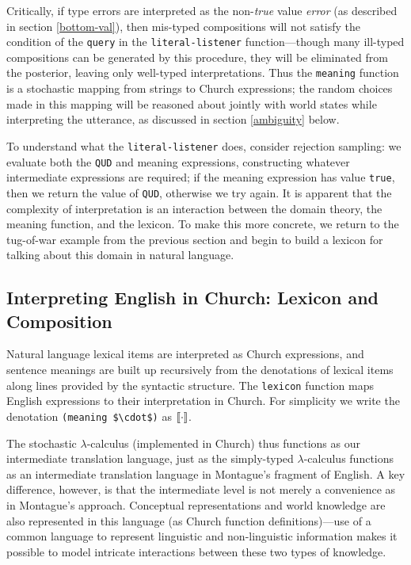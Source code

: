 \documentclass[12pt]{article}
\newcommand{\llbracket}{\ensuremath{\left [\!\left [}}%
\newcommand{\rrbracket}{\ensuremath{\right ]\!\right ]}}
\newcommand{\denot}[1]{\ensuremath{\llbracket \mathit{#1} \rrbracket}}
\begin{document}
Critically, if type errors are interpreted as the non-\emph{true} value \emph{error} (as described in section \ref{bottom-val}), then mis-typed compositions will not satisfy the condition of the \lstinline{query} in the \lstinline{literal-listener} function---though many ill-typed compositions can be generated by this procedure, they will be eliminated from the posterior, leaving only well-typed interpretations.
Thus the \lstinline{meaning} function is a stochastic mapping from strings to Church expressions; the random choices made in this mapping will be reasoned about jointly with world states while interpreting the utterance, as discussed in section \ref{ambiguity} below.

To understand what the \lstinline{literal-listener} does, consider rejection sampling: we evaluate both the \lstinline{QUD} and meaning expressions, constructing whatever intermediate expressions are required; if the meaning expression has value \lstinline{true}, then we return the value of \lstinline{QUD}, otherwise we try again. 
It is apparent that the complexity of interpretation is an interaction between the domain theory, the meaning function, and the lexicon. 
To make this more concrete, we return to the tug-of-war example from the previous section and begin to build a lexicon for talking about this domain in natural language. 

\subsection{Interpreting English in Church: Lexicon and Composition}
\label{lexicon}
Natural language lexical items are interpreted as Church expressions, and sentence meanings are built up recursively from the denotations of lexical items along lines provided by the syntactic  structure. 
The \lstinline{lexicon} function maps English expressions to their interpretation in Church.
For simplicity we write the denotation \lstinline[mathescape]{(meaning $\cdot$)} as \denot{\cdot}. 

The stochastic $\lambda$-calculus (implemented in Church) thus functions as our intermediate translation language, just as the simply-typed $\lambda$-calculus functions as an intermediate translation language in Montague's \citeyear{montague73} fragment of English. 
A key difference, however, is that the intermediate level is not merely a convenience as in Montague's approach. 
Conceptual representations and world knowledge are also represented in this language (as Church function definitions)---use of a common language to represent linguistic and non-linguistic information makes it possible to model intricate interactions between these two types of knowledge. 
\end{document}
